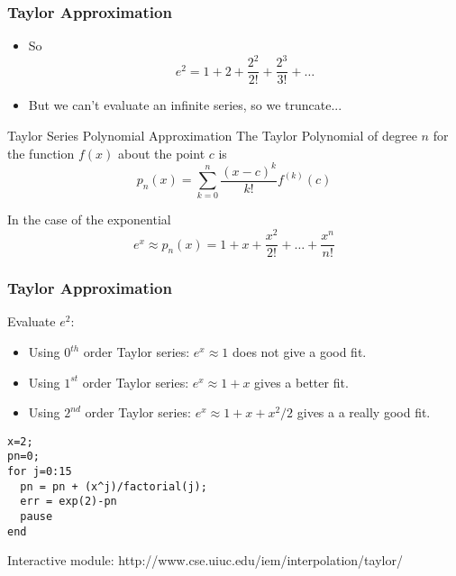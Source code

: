 \documentclass[10pt]{beamer}
\begin{document}
\begin{frame}
\frametitle{Taylor Approximation}
\begin{itemize}
\item
    So
    \begin{equation*}
    e^2 = 1 + 2 + \frac{2^2}{2!} + \frac{2^3}{3!} + \dots
\end{equation*}
\item But we can't evaluate an infinite series, so we truncate...
\end{itemize}
\begin{block}{Taylor Series Polynomial Approximation}
  The Taylor Polynomial of degree $n$ for the function $f(x)$ about the
point $c$ is 
\begin{equation*}
        p_n(x) = \sum_{k=0}^{n} \frac{(x-c)^{k}}{k!} f^{(k)}(c)
\end{equation*}
\end{block}
\begin{example}[$e^x$]
In the case of the exponential
\begin{equation*}
        e^x \approx p_n(x) = 1 + x + \frac{x^2}{2!} + \dots + \frac{x^n}{n!}
\end{equation*}
\end{example}
\end{frame}
\begin{frame}[fragile]
\frametitle{Taylor Approximation}
Evaluate $e^2$:
\begin{itemize}
  \item Using $0^{th}$ order Taylor series: $e^x \approx 1$ does not
give a good fit.
  \item Using $1^{st}$ order Taylor series: $e^x \approx 1 + x$ gives a
better fit.
  \item Using $2^{nd}$ order Taylor series: $e^x \approx 1 + x + x^2/2$ gives a
a really good fit.
\end{itemize}
\begin{lstlisting}
x=2;
pn=0;
for j=0:15
  pn = pn + (x^j)/factorial(j);
  err = exp(2)-pn
  pause
end
\end{lstlisting}

\bigskip
Interactive module: http://www.cse.uiuc.edu/iem/interpolation/taylor/
\end{frame}
\end{document}
